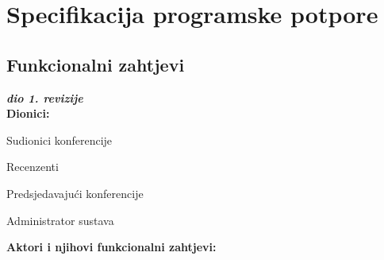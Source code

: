 \chapter{Specifikacija programske potpore}
		
	\section{Funkcionalni zahtjevi}
			
			\textbf{\textit{dio 1. revizije}}\\
			
			
			\noindent \textbf{Dionici:}
			
			\begin{packed_enum}
				
				\item Sudionici konferencije
				\item Recenzenti
				\item Predsjedavajući konferencije				
				\item Administrator sustava
				
			\end{packed_enum}
			
			\noindent \textbf{Aktori i njihovi funkcionalni zahtjevi:}
			
